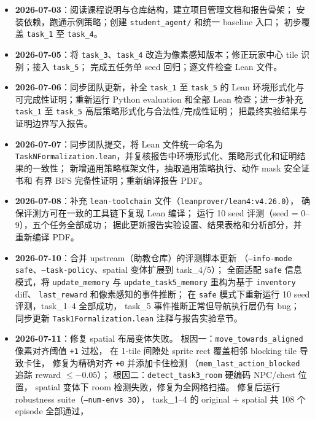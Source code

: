 \documentclass[12pt,a4paper]{ctexart}
\begin{document}
\begin{itemize}[leftmargin=2em]
  \item \textbf{2026-07-03}：阅读课程说明与仓库结构，建立项目管理文档和报告骨架；
  安装依赖，跑通示例策略；创建 \texttt{student\_agent/} 和统一 baseline 入口；
  初步覆盖 \texttt{task\_1} 至 \texttt{task\_4}。
  \item \textbf{2026-07-05}：将 \texttt{task\_3}、\texttt{task\_4}
  改造为像素感知版本；修正玩家中心 tile 识别；接入 \texttt{task\_5}；
  完成五任务单 seed 回归；逐文件检查 Lean 文件。
  \item \textbf{2026-07-06}：同步团队更新，补全 \texttt{task\_1} 至
  \texttt{task\_5} 的 Lean 环境形式化与可完成性证明；重新运行 Python evaluation
  和全部 Lean 检查；进一步补充 \texttt{task\_1} 至 \texttt{task\_5}
  高层策略形式化与合法性/完成性证明；
  把最终实验结果与证明边界写入报告。
  \item \textbf{2026-07-07}：同步团队提交，将 Lean 文件统一命名为
  \texttt{TaskNFormalization.lean}，并复核报告中环境形式化、策略形式化和证明结果的一致性；
  新增通用策略框架文件，抽取通用策略执行、动作 mask 安全证书和
  有界 BFS 完备性证明；重新编译报告 PDF。
  \item \textbf{2026-07-08}：补充 \texttt{lean-toolchain} 文件（\texttt{leanprover/lean4:v4.26.0}），
  确保评测方可在一致的工具链下复现 Lean 编译；
  运行 10 seed 评测（seed = 0--9），五个任务全部成功；
  据此更新报告实验设置、结果表格和分析部分，并重新编译 PDF。
  \item \textbf{2026-07-10}：合并 upstream（助教仓库）的评测脚本更新
  （\texttt{--info-mode safe}、\texttt{--task-policy}、spatial 变体扩展到 task\_4/5）；
  全面适配 \texttt{safe} 信息模式，将 \texttt{update\_memory} 与
  \texttt{update\_task5\_memory} 重构为基于 \texttt{inventory} diff、
  \texttt{last\_reward} 和像素感知的事件推断；
  在 \texttt{safe} 模式下重新运行 10 seed 评测，task\_1--4 全部成功，
  task\_5 事件推断正常但导航执行层仍有 bug；
  同步更新 \texttt{Task1Formalization.lean} 注释与报告实验章节。
  \item \textbf{2026-07-11}：修复 spatial 布局变体失败。
  根因一：\texttt{move\_towards\_aligned} 像素对齐阈值 \texttt{+1} 过松，
  在 1-tile 间隙处 sprite rect 覆盖相邻 blocking tile 导致卡住，
  修复为精确对齐 \texttt{+0} 并添加卡住检测
  （\texttt{mem\_last\_action\_blocked} 追踪 reward $\leq -0.05$）；
  根因二：\texttt{detect\_task3\_room} 硬编码 NPC/chest 位置，
  spatial 变体下 room 检测失败，修复为全网格扫描。
  修复后运行 robustness suite（\texttt{--num-envs 30}），
  task\_1--4 的 original + spatial 共 108 个 episode 全部通过，

\end{itemize}
\end{document}
